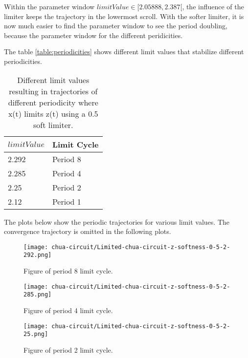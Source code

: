 \documentclass[main]{subfiles}
\begin{document}
Within the parameter window \(limitValue \in [2.05888,2.387[\), the influence of the limiter keeps the trajectory in the lowermost scroll. With the softer limiter, it is now much easier to find the parameter window to see the period doubling, because the parameter window for the different peridicities. 

The table \ref{table:periodicities} shows different limit values that stabilize different periodicities.

\begin{table}[H]
\renewcommand{\arraystretch}{1.2}
\center
\begin{tabular}{@{}ll@{}}
	\toprule
   \(limitValue\) & Limit Cycle\\
   \midrule
   2.292 & Period 8 \\ 
   2.285 & Period 4 \\
   2.25  & Period 2 \\
   2.12 & Period 1 \\
   \bottomrule
\end{tabular}
\caption[Periodicity control limit values (x(t) limiting z(t) with softness 0.5)]{Different limit values resulting in trajectories of different periodicity where x(t) limits z(t) using a 0.5 soft limiter.}
\label{table:z-0.5-periodicities}
\end{table}

The plots below show the periodic trajectories for various limit values. The convergence trajectory is omitted in the following plots.


\begin{figure}[H]
\centering
\texttt{[image: chua-circuit/Limited-chua-circuit-z-softness-0-5-2-292.png]}
\caption[Figure of period 8 limit cycle.]{Figure of period 8 limit cycle.}
\label{figure:z-0.5-8-limit-cycle-trajectory}
\end{figure}

\begin{figure}[H]
\centering
\texttt{[image: chua-circuit/Limited-chua-circuit-z-softness-0-5-2-285.png]}
\caption[Figure of period 4 limit cycle.]{Figure of period 4 limit cycle.}
\label{figure:z-0.5-4-limit-cycle-trajectory}
\end{figure}

\begin{figure}[H]
\centering
\texttt{[image: chua-circuit/Limited-chua-circuit-z-softness-0-5-2-25.png]}
\caption[Figure of period 3 limit cycle.]{Figure of period 2 limit cycle.}
\label{figure:z-0.5-2-limit-cycle-trajectory}
\end{figure}
\end{document}
